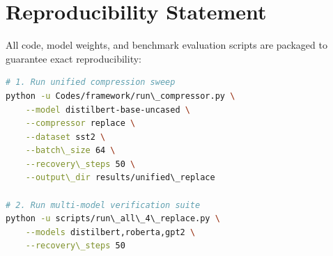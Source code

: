 \section{Reproducibility Statement}
All code, model weights, and benchmark evaluation scripts are packaged to guarantee exact reproducibility:
\begin{lstlisting}[language=bash]
# 1. Run unified compression sweep
python -u Codes/framework/run\_compressor.py \
    --model distilbert-base-uncased \
    --compressor replace \
    --dataset sst2 \
    --batch\_size 64 \
    --recovery\_steps 50 \
    --output\_dir results/unified\_replace

# 2. Run multi-model verification suite
python -u scripts/run\_all\_4\_replace.py \
    --models distilbert,roberta,gpt2 \
    --recovery\_steps 50
\end{lstlisting}

